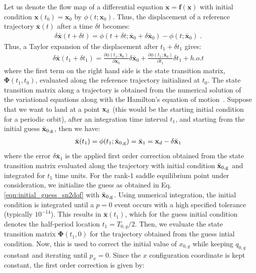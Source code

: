 \documentclass{ws-ijbc}
\begin{document}
Let us denote the flow map of a differential equation $\dot{\mathbf{x}} = \mathbf{f}(\mathbf{x})$ with initial condition $\mathbf{x}(t_0) = \mathbf{x}_0$ by $\phi(t;\mathbf{x}_0)$. Thus, the displacement of a reference trajectory $\bar{\mathbf{x}}(t)$ after a time $\delta t$ becomes:
\begin{align}
\delta \bar{\mathbf{x}}(t + \delta t) = \phi(t + \delta 
t;\bar{\mathbf{x}}_0 + \delta \bar{\mathbf{x}}_0) - 
\phi(t ;\bar{\mathbf{x}}_0) \;.
\end{align}
Thus, a Taylor expansion of the displacement after $t_1 + \delta t_1$ gives:
\begin{align}
\delta \bar{\mathbf{x}}(t_1 + \delta t_1) = 
\frac{\partial \phi(t_1;\bar{\mathbf{x}}_0)}{\partial 
	\mathbf{x}_0}\delta \bar{\mathbf{x}}_0 + \frac{\partial 
	\phi(t_1;\bar{\mathbf{x}}_0)}{\partial t_1}\delta t_1 + 
h.o.t
\end{align}
%
where the first term on the right hand side is the state transition matrix, $\mathbf{\Phi}(t_1,t_0)$, evaluated along the reference trajectory initialized at $t_0$. The state transition matrix along a trajectory is obtained from the numerical solution of the variational equations along with the Hamilton's equation of motion~\cite{Parker1989}. Suppose that we want to land at a point $\mathbf{x}_{\rm d}$ (this would be the starting initial condition for a periodic orbit), after an integration time interval $t_1$, and starting from the initial guess $\bar{\mathbf{x}}_{\rm 0, g}$, then we have:
\begin{align}
\bar{\mathbf{x}}(t_1) = \phi(t_1;\bar{\mathbf{x}}_{\rm 0, g}) 
= \bar{\mathbf{x}}_1 = \mathbf{x}_d - \delta 
\bar{\mathbf{x}}_1
\end{align}
where the error $\delta \bar{\mathbf{x}}_1$ is the applied first order correction obtained from the state transition matrix evaluated along the trajectory with initial condition $\bar{\mathbf{x}}_{\rm 0, g}$ and integrated for $t_1$ time units. For the rank-1 saddle equilibrium point under consideration, we initialize the guess as obtained in Eq. \eqref{eqn:initial_guess_sn2dof} with $\bar{\mathbf{x}}_{\rm 0, g}$. Using numerical integration, the initial condition is integrated until a $p = 0$ event occurs with a high specified tolerance (typically $10^{-14}$). This results in $\bar{\mathbf{x}}(t_1)$, which for the guess initial condition denotes the half-period location $t_1 = T_{0,g}/2$. Then, we evaluate the state transition matrix $\mathbf{\Phi}(t_1,0)$ for the trajectory obtained from the guess intial condition. Now, this is used to correct the initial value of $x_{0,g}$ while keeping $q_{0,g}$ constant and iterating until $p_x = 0$. Since the $x$ configuration coordinate is kept constant, the first order correction is given by:
\end{document}

